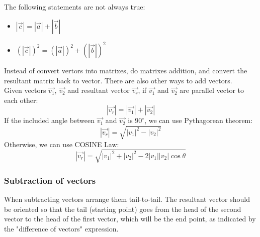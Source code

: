 The following statements are not always true:
\begin{itemize}
    \item $\left|\vec{c}\right| = \left|\vec{a}\right| + \left|\vec{b}\right|$
    \item $(\left|\vec{c}\right|)^2 = (\left|\vec{a}\right|)^2 + (\left|\vec{b}\right|)^2$
\end{itemize}

Instead of convert vertors into matrixes, do matrixes addition, and convert the resultant matrix back to vector. 
There are also other ways to add vectors. \\

Given vectors $\vec{v_1}$, $\vec{v_2}$ and resultant vector $\vec{v_r}$,
if $\vec{v_1}$ and $\vec{v_2}$ are parallel vector to each other:
\[
    \left|\vec{v_r}\right| = \left|\vec{v_1}\right| + \left|\vec{v_2}\right|
\]
If the included angle between $\vec{v_1}$ and $\vec{v_2}$ is $90^{\circ}$, we can use Pythagorean theorem:
\[
    \left|\vec{v_r}\right| = \sqrt{\left|v_1\right|^2 - \left|v_2\right|^2}
\]
Otherwise, we can use COSINE Law:
\[
    \left|\vec{v_r}\right| = \sqrt{\left|v_1\right|^2 + \left|v_2\right|^2 - 2\left|v_1\right|\left|v_2\right|\cos \theta}
\]

\subsubsection{Subtraction of vectors}
When subtracting vectors arrange them tail-to-tail. The resultant vector should be oriented so that the tail (starting point) goes from the head of the second 
vector to the head of the first vector, which will be the end point, as indicated by the "difference of vectors" expression. 

\newpage